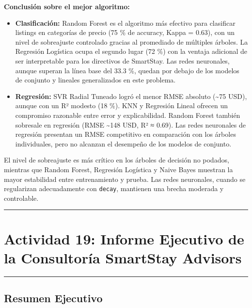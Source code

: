 \documentclass[
]{article}
\begin{document}
\textbf{Conclusión sobre el mejor algoritmo:}

\begin{itemize}
\item
  \textbf{Clasificación:} Random Forest es el algoritmo más efectivo
  para clasificar listings en categorías de precio (75 \% de accuracy,
  Kappa = 0.63), con un nivel de sobreajuste controlado gracias al
  promediado de múltiples árboles. La Regresión Logística ocupa el
  segundo lugar (72 \%) con la ventaja adicional de ser interpretable
  para los directivos de SmartStay. Las redes neuronales, aunque superan
  la línea base del 33.3 \%, quedan por debajo de los modelos de
  conjunto y lineales generalizados en este problema.
\item
  \textbf{Regresión:} SVR Radial Tuneado logró el menor RMSE absoluto
  (\textasciitilde75 USD), aunque con un R² modesto (18 \%). KNN y
  Regresión Lineal ofrecen un compromiso razonable entre error y
  explicabilidad. Random Forest también sobresale en regresión (RMSE
  \textasciitilde148 USD, R² ≈ 0.69). Las redes neuronales de regresión
  presentan un RMSE competitivo en comparación con los árboles
  individuales, pero no alcanzan el desempeño de los modelos de
  conjunto.
\end{itemize}

El nivel de sobreajuste es más crítico en los árboles de decisión no
podados, mientras que Random Forest, Regresión Logística y Naive Bayes
muestran la mayor estabilidad entre entrenamiento y prueba. Las redes
neuronales, cuando se regularizan adecuadamente con \texttt{decay},
mantienen una brecha moderada y controlable.

\begin{center}\rule{0.5\linewidth}{0.5pt}\end{center}

\section{Actividad 19: Informe Ejecutivo de la Consultoría SmartStay
Advisors}\label{actividad-19-informe-ejecutivo-de-la-consultoruxeda-smartstay-advisors}

\begin{center}\rule{0.5\linewidth}{0.5pt}\end{center}

\subsection{Resumen Ejecutivo}\label{resumen-ejecutivo}
\end{document}
